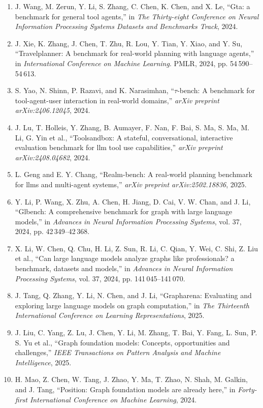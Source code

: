 \documentclass[10pt,UTF8,fontset=fandol]{ctexart}
\begin{document}
\begin{enumerate}[leftmargin=2.4em,labelsep=0.4em,itemsep=0.15em]
\item J. Wang, M. Zerun, Y. Li, S. Zhang, C. Chen, K. Chen, and X. Le, ``Gta: a benchmark for general tool agents,'' in \textit{The Thirty-eight Conference on Neural Information Processing Systems Datasets and Benchmarks Track}, 2024.
\item J. Xie, K. Zhang, J. Chen, T. Zhu, R. Lou, Y. Tian, Y. Xiao, and Y. Su, ``Travelplanner: A benchmark for real-world planning with language agents,'' in \textit{International Conference on Machine Learning}. PMLR, 2024, pp. 54\,590--54\,613.
\item S. Yao, N. Shinn, P. Razavi, and K. Narasimhan, ``$\tau$-bench: A benchmark for tool-agent-user interaction in real-world domains,'' \textit{arXiv preprint arXiv:2406.12045}, 2024.
\item J. Lu, T. Holleis, Y. Zhang, B. Aumayer, F. Nan, F. Bai, S. Ma, S. Ma, M. Li, G. Yin et al., ``Toolsandbox: A stateful, conversational, interactive evaluation benchmark for llm tool use capabilities,'' \textit{arXiv preprint arXiv:2408.04682}, 2024.
\item L. Geng and E. Y. Chang, ``Realm-bench: A real-world planning benchmark for llms and multi-agent systems,'' \textit{arXiv preprint arXiv:2502.18836}, 2025.
\item Y. Li, P. Wang, X. Zhu, A. Chen, H. Jiang, D. Cai, V. W. Chan, and J. Li, ``Glbench: A comprehensive benchmark for graph with large language models,'' in \textit{Advances in Neural Information Processing Systems}, vol. 37, 2024, pp. 42\,349--42\,368.
\item X. Li, W. Chen, Q. Chu, H. Li, Z. Sun, R. Li, C. Qian, Y. Wei, C. Shi, Z. Liu et al., ``Can large language models analyze graphs like professionals? a benchmark, datasets and models,'' in \textit{Advances in Neural Information Processing Systems}, vol. 37, 2024, pp. 141\,045--141\,070.
\item J. Tang, Q. Zhang, Y. Li, N. Chen, and J. Li, ``Grapharena: Evaluating and exploring large language models on graph computation,'' in \textit{The Thirteenth International Conference on Learning Representations}, 2025.
\item J. Liu, C. Yang, Z. Lu, J. Chen, Y. Li, M. Zhang, T. Bai, Y. Fang, L. Sun, P. S. Yu et al., ``Graph foundation models: Concepts, opportunities and challenges,'' \textit{IEEE Transactions on Pattern Analysis and Machine Intelligence}, 2025.
\item H. Mao, Z. Chen, W. Tang, J. Zhao, Y. Ma, T. Zhao, N. Shah, M. Galkin, and J. Tang, ``Position: Graph foundation models are already here,'' in \textit{Forty-first International Conference on Machine Learning}, 2024.

\end{enumerate}
\end{document}
